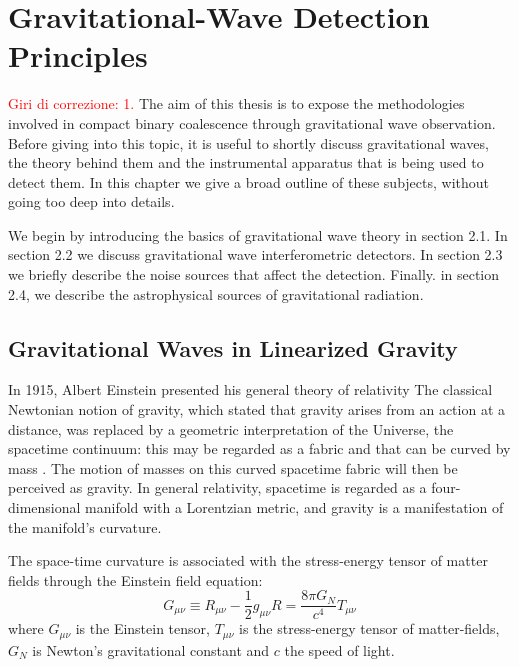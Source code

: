 \documentclass[binding=0.6cm, LaM]{sapthesis}
\newcommand{\fpg}[1]{\textcolor{red}{#1} }
\begin{document}
\chapter{Gravitational-Wave Detection Principles}
\label{ch:GWDetectionPrinciples}
\fpg{Giri di correzione: 1.}%
	The aim of this thesis is to expose the methodologies involved 
	in compact binary coalescence through gravitational wave observation. 
	Before giving into this topic, it is useful to shortly discuss gravitational waves, 
	the theory behind them and the instrumental apparatus that is being used to detect them. 
	In this chapter we give a broad outline of these subjects, 
	without going too deep into details.

	We begin by introducing the basics of gravitational wave theory in section 2.1. 
	In section 2.2 we discuss gravitational wave interferometric detectors. 
	In section 2.3 we briefly describe the noise sources that affect the detection. 
	Finally. in section 2.4, we describe the astrophysical sources of gravitational radiation.

\section{Gravitational Waves in Linearized Gravity}

	In 1915, Albert Einstein presented his general theory of relativity
	The classical Newtonian notion of gravity, which stated that gravity arises from an 
	action at a distance, was replaced by a geometric interpretation of the Universe, 
	the spacetime continuum: this may be regarded as a fabric and that can be curved 
	by mass \cite{1}. 
	The motion of masses on this curved spacetime fabric will then be perceived as gravity. 
	In general relativity, spacetime is regarded as a four-dimensional manifold 
	with a Lorentzian metric, and gravity is a manifestation of the manifold’s curvature.

	The space-time curvature is associated with the stress-energy tensor 
	of matter fields through the Einstein field equation:
		\begin{equation}
		G_{\mu\nu} \equiv R_{\mu\nu}  - {\frac{1}{2}}g_{\mu\nu}R = \frac{8\pi G_{N}}{c^4}T_{\mu\nu} 
		\end{equation}
	where $G_{\mu\nu} $ is the Einstein tensor, $T_{\mu\nu} $ is the stress-energy 
	tensor of matter-fields, $ G_{N}$ is Newton’s gravitational constant and $c$ the speed of light.
\end{document}
